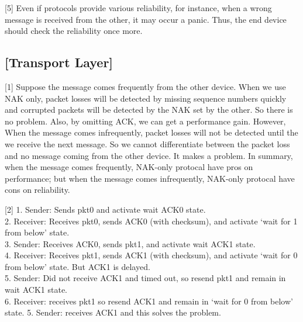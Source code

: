 \documentclass{homework}
\begin{document}
[5] Even if protocols provide various reliability, for instance, when a wrong message is received from the other, it may occur a panic. Thus, the end device should check the reliability once more.


\subsection*{[Transport Layer]}

[1] Suppose the message comes frequently from the other device. When we use NAK only, packet losses will be detected by missing sequence numbers quickly and corrupted packets will be detected by the NAK set by the other. So there is no problem. Also, by omitting ACK, we can get a performance gain. However, When the message comes infrequently, packet losses will not be detected until the we receive the next message. So we cannot differentiate between the packet loss and no message coming from the other device. It makes a problem. In summary, when the message comes frequently, NAK-only protocal have pros on performance; but when the message comes infrequently, NAK-only protocal have cons on reliability.


[2] 
1. Sender: Sends pkt0 and activate wait ACK0 state.\\
2. Receiver: Receives pkt0, sends ACK0 (with checksum), and activate `wait for 1 from below' state.\\
3. Sender: Receives ACK0, sends pkt1, and activate wait ACK1 state.\\
4. Receiver: Receives pkt1, sends ACK1 (with checksum), and activate `wait for 0 from below' state. But ACK1 is delayed.\\
5. Sender: Did not receive ACK1 and timed out, so resend pkt1 and remain in wait ACK1 state.\\
6. Receiver: receives pkt1 so resend ACK1 and remain in `wait for 0 from below' state.
5. Sender: receives ACK1 and this solves the problem.
\end{document}

